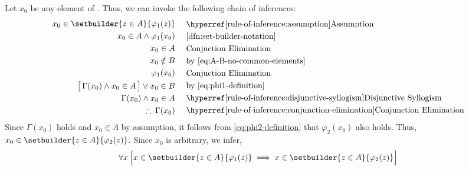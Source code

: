 \begin{rem}
    \vspace{0.3cm}
    \noindent
    Let \( x_{0} \) be any element of .
    Thus, we can invoke the following chain of inferences:
    \begin{equation*}
        \begin{aligned}
            x_{0} \in \setbuilder{z \in A}{\varphi_{1}(z)}& \\
            x_{0} \in A \land \varphi_{1}(x_{0})& \\
            x_{0} \in A& \\
            x_{0} \notin B& \\
            \varphi_{1}(x_{0})& \\
            \big[\, \Gamma(x_{0}) \land x_{0} \in A \,\big] \lor x_{0} \in B& \\
            \Gamma(x_{0}) \land x_{0} \in A& \\
            \therefore \, \Gamma(x_{0})&
        \end{aligned}
        \text{  }
        \begin{aligned}
            &\quad\text{\aref{rule-of-inference:assumption}{Assumption}}\\
            &\quad\text{\cref{dfn:set-builder-notation}}\\
            &\quad\text{Conjuction Elimination}\\
            &\quad\text{by \eqref{eq:A-B-no-common-elements}}\\
            &\quad\text{Conjuction Elimination}\\
            &\quad\text{by \eqref{eq:phi1-definition}}\\
            &\quad\text{\aref{rule-of-inference:disjunctive-syllogism}{Disjunctive Syllogism}}\\
            &\quad\text{\aref{rule-of-inference:conjunction-elimination}{Conjunction Elimination}}
        \end{aligned}
    \end{equation*}
    Since \( \Gamma(x_{0}) \) holds and \( x_{0} \in A \) by assumption, it follows from
    \eqref{eq:phi2-definition} that \( \varphi_{2}(x_{0}) \) also holds. Thus, \( x_{0} \in
    \setbuilder{z \in A}{\varphi_{2}(z)} \). Since \( x_{0} \) is arbitrary, we infer,
    \begin{equation*}
        \forall x \, \Big[ x \in \setbuilder{z \in A}{\varphi_{1}(z)}
        \implies x \in \setbuilder{z \in A}{\varphi_{2}(z)} \Big]
    \end{equation*}

\end{rem}
